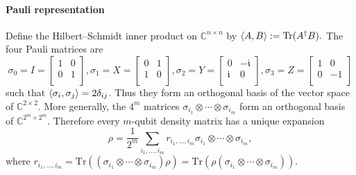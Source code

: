 \paragraph{Pauli representation}
Define the Hilbert–Schmidt inner product on $\mathbb{C}^{n\times n}$ by $\braket{A,B}:=\mathrm{Tr}(A^\dagger B).$
The four Pauli matrices are 
$$
\sigma_0=I=\left[\begin{matrix}
    1 & 0\\
    0 & 1\\
\end{matrix}\right],
\sigma_1=X=\left[\begin{matrix}
    0 & 1\\
    1 & 0\\
\end{matrix}\right],
\sigma_2=Y=\left[\begin{matrix}
    0 & -\mathfrak i\\
    \mathfrak i & 0\\
\end{matrix}\right],
\sigma_3=Z=\left[\begin{matrix}
    1 & 0\\
    0 & -1\\
\end{matrix}\right]
$$
such that $\braket{\sigma_i,\sigma_j}=2\delta_{ij}$.
Thus they form an orthogonal basis of the vector space of $\mathbb{C}^{2\times 2}.$
More generally, the $4^m$ matrices $\sigma_{i_1}\otimes\cdots\otimes  \sigma_{i_m}$ form an orthogonal basis of $\mathbb{C}^{2^m\times 2^m}$.
Therefore every $m$-qubit density matrix has a unique expansion
$$
    \rho=\frac{1}{2^m}\sum_{i_1,\ldots,i_m}r_{i_1,\ldots,i_m}\sigma_{i_1}\otimes \cdots\otimes \sigma_{i_m},
$$
where $r_{i_1,\ldots,i_m}=\mathrm{Tr}((\sigma_{i_1}\otimes\cdots\otimes\sigma_{i_m})\rho)=\mathrm{Tr}(\rho(\sigma_{i_1}\otimes\cdots\otimes\sigma_{i_m}))$.
